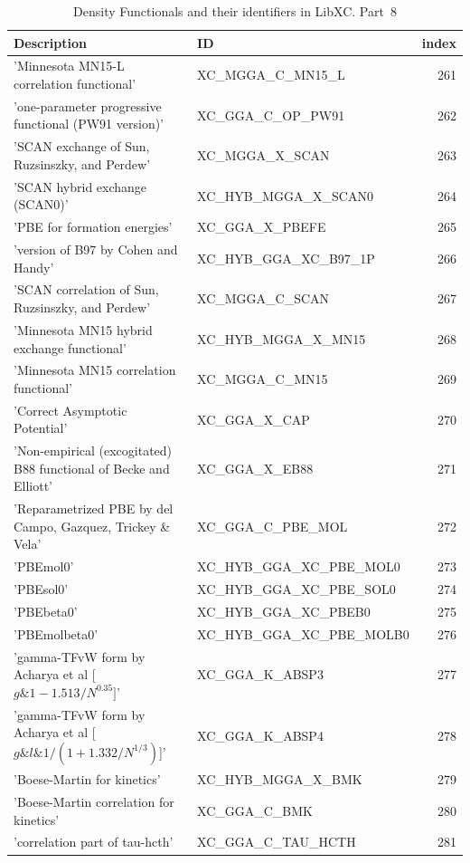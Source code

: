 \documentclass[final,12pt,makeidx,DIV=calc]{article}
\begin{document}
{{{\begin{table}[!h]
\caption{Density Functionals and their identifiers in LibXC. Part~8}
\begin{center}
\begin{tabular}{llr}
\hline
\hline
Description & ID & index\\
\hline
  'Minnesota MN15-L correlation functional' & XC\_MGGA\_C\_MN15\_L  &261\\
  'one-parameter progressive functional (PW91 version)' & XC\_GGA\_C\_OP\_PW91  &262\\
  'SCAN exchange of Sun, Ruzsinszky, and Perdew' & XC\_MGGA\_X\_SCAN  &263\\
  'SCAN hybrid exchange (SCAN0)' & XC\_HYB\_MGGA\_X\_SCAN0  &264\\
  'PBE for formation energies' & XC\_GGA\_X\_PBEFE  &265\\
  'version of B97 by Cohen and Handy' & XC\_HYB\_GGA\_XC\_B97\_1P  &266\\
  'SCAN correlation of Sun, Ruzsinszky, and Perdew' & XC\_MGGA\_C\_SCAN  &267\\
  'Minnesota MN15 hybrid exchange functional' & XC\_HYB\_MGGA\_X\_MN15  &268\\
  'Minnesota MN15 correlation functional' & XC\_MGGA\_C\_MN15  &269\\
  'Correct Asymptotic Potential' & XC\_GGA\_X\_CAP  &270\\
  'Non-empirical (excogitated) B88 functional of Becke and Elliott' & XC\_GGA\_X\_EB88  &271\\
  'Reparametrized PBE by del Campo, Gazquez, Trickey \& Vela' & XC\_GGA\_C\_PBE\_MOL  &272\\
  'PBEmol0' & XC\_HYB\_GGA\_XC\_PBE\_MOL0  &273\\
  'PBEsol0' & XC\_HYB\_GGA\_XC\_PBE\_SOL0  &274\\
  'PBEbeta0' & XC\_HYB\_GGA\_XC\_PBEB0  &275\\
  'PBEmolbeta0' & XC\_HYB\_GGA\_XC\_PBE\_MOLB0  &276\\
  'gamma-TFvW form by Acharya et al [$g \& 1 - 1.513/N^{0.35}]$' & XC\_GGA\_K\_ABSP3  &277\\
  'gamma-TFvW form by Acharya et al [$g \& l \& 1/(1 + 1.332/N^{1/3})$]' & XC\_GGA\_K\_ABSP4  &278\\
  'Boese-Martin for kinetics' & XC\_HYB\_MGGA\_X\_BMK  &279\\
  'Boese-Martin correlation for kinetics' & XC\_GGA\_C\_BMK  &280\\
  'correlation part of tau-hcth' & XC\_GGA\_C\_TAU\_HCTH  &281\\

\end{tabular}
\end{center}
\end{table}}}}
\end{document}

